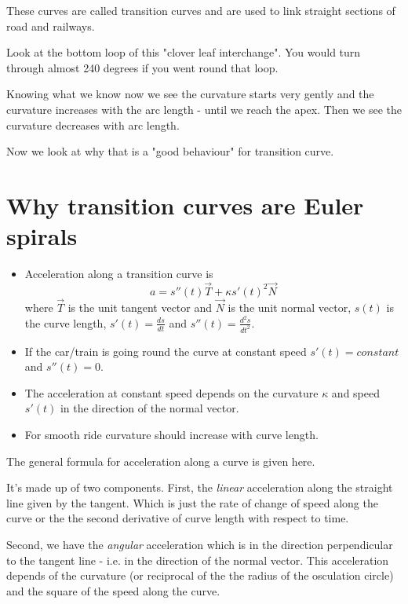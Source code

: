 \documentclass[12pt]{article} %
\theoremstyle{definition}
\theoremstyle{theorem}
\begin{document}
These curves are called transition curves and are used to link straight sections of road and railways.

Look at the bottom loop of this "clover leaf interchange". You would turn through almost 240 degrees if you went round that loop. 

Knowing what we know now we see the curvature starts very gently and the curvature increases with the arc length - until we reach the apex. Then we see the curvature decreases with arc length.

Now we look at why that is a "good behaviour" for transition curve.


\section{Why transition curves are Euler spirals}
\begin{tcolorbox}
	\begin{itemize}
	\item Acceleration along a transition curve is
 	 \[
 	 a=s''(t) \vec{T}+\kappa s'(t)^2 \vec{N}
 	 \]
 	 where $\vec{T}$ is the unit tangent vector and $\vec{N}$ is the unit normal vector, $s(t)$ is the curve length, $s'(t) = \frac{ds}{dt}$ and $s''(t) = \frac{d^2 s}{dt^2}$.
 	 \item If the car/train is going round the curve at constant speed $s'(t)=constant$ and $s''(t)=0$.	
 	 \item The acceleration at constant speed depends on the curvature $\kappa$ and speed $s'(t)$ in the direction of the normal vector.
 	 \item For smooth ride curvature should increase with curve length.
	\end{itemize}
\end{tcolorbox}

The general formula for acceleration along a curve is given here. 

It's made up of two components. First, the \emph{linear} acceleration along the straight line given by the tangent. Which is just the rate of change of speed along the curve or the the second derivative of curve length with respect to time.

Second, we have the \emph{angular} acceleration which is in the direction perpendicular to the tangent line - i.e. in the direction of the normal vector. This acceleration depends of the curvature (or reciprocal of the the radius of the osculation circle) and the square of the speed along the curve.
\end{document}
